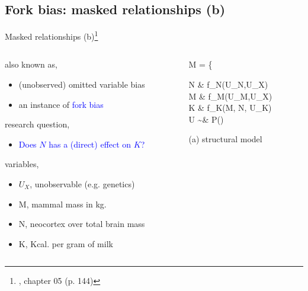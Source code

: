 \subsection{Fork bias: masked relationships (b)}
%
%
\begin{frame}[t, negative]
	\subsectionpage
\end{frame}
%
%
\begin{frame}
	{Masked relationships (b)\footnote{\citet{McElreath_2020}, chapter 05 (p. 144)}}
	\begin{columns}
		\begin{column}{0.5\textwidth}
			also known as,
			\begin{itemize}
				\item (unobserved) omitted variable bias
				\item an instance of \textcolor{blue}{fork bias}
			\end{itemize}
			
			research question, 
			\begin{itemize}
				\item \textcolor{blue}{Does $N$ has a (direct) effect on $K$?}
			\end{itemize}
			
			variables,
			\begin{itemize}
				\item $U_{X}$, unobservable (e.g. genetics)
				\item M, mammal mass in kg.
				\item N, neocortex over total brain mass
				\item K, Kcal. per gram of milk
			\end{itemize}
		\end{column}
		\begin{column}{0.5\textwidth}  
			\begin{equ}
				M = \left\{ \begin{aligned} 
					N \leftarrow & \; f_{N}(U_{N},U_{X}) \\
					M \leftarrow & \; f_{M}(U_{M},U_{X}) \\
					K \leftarrow & \; f_{K}(M, N, U_{K}) \\
					U \sim & \; P()
				\end{aligned} \right
				\caption*{(a) structural model}
			\end{equ}
			\begin{figure}
\end{figure}
\end{column}
\end{columns}
\end{frame}
